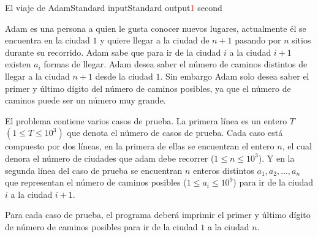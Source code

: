\begin{problem}{El viaje de Adam}{Standard input}{Standard output}{\textcolor{red}{1} second}{}


Adam es una persona a quien le gusta conocer nuevos lugares, actualmente él se encuentra en la ciudad $1$ y quiere llegar a la ciudad de $n + 1$ pasando por $n$ sitios durante su recorrido. 
Adam sabe que para ir de la ciudad $i$  a la ciudad $i + 1$ existen $a_i$ formas de llegar. Adam desea saber el número de caminos distintos de llegar a la ciudad $n + 1$ desde la ciudad $1$. 
Sin embargo Adam solo desea saber el primer y último dígito del número de caminos posibles, ya que el número de caminos puede ser un número muy grande.

\InputFile
El problema contiene varios casos de prueba. La primera l\'inea es un entero $T$ $(1\leq T \leq 10^3)$ que denota el número de casos de prueba. 
Cada caso está compuesto por dos l\'ineas, en la primera de ellas se encuentran el entero $n$, el cual denora el número de ciudades que adam debe recorrer ($1 \leq n \leq 10^3$). 
Y en la segunda l\'inea del caso de prueba se encuentran $n$ enteros distintos $a_1, a_2, \dots, a_n$ que representan el número de caminos posibles ($1 \leq a_i \leq 10^9$) para ir de la ciudad $i$ a la ciudad $i + 1$.

\OutputFile
Para cada caso de prueba, el programa deber\'a imprimir el primer y último dígito de número de caminos posibles para ir de la ciudad $1$ a la ciudad $n$.

\Example

\begin{example}
\end{example}

\end{problem}
